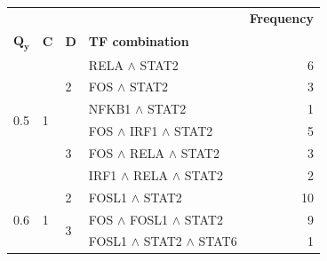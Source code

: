 \begin{tabular}{llllr}
\toprule
 &  &  &  & \textbf{Frequency} \\
$\mathbf{Q_y}$ & $\mathbf{C}$ & $\mathbf{D}$ & \textbf{TF combination} &  \\
\midrule
\multirow[t]{6}{*}{0.5} & \multirow[t]{6}{*}{1} & \multirow[t]{3}{*}{2} & {RELA $\wedge$ STAT2} & 6 \\
 &  &  & {FOS $\wedge$ STAT2} & 3 \\
 &  &  & {NFKB1 $\wedge$ STAT2} & 1 \\
\cline{3-5}
 &  & \multirow[t]{3}{*}{3} & {FOS $\wedge$ IRF1 $\wedge$ STAT2} & 5 \\
 &  &  & {FOS $\wedge$ RELA $\wedge$ STAT2} & 3 \\
 &  &  & {IRF1 $\wedge$ RELA $\wedge$ STAT2} & 2 \\
\cline{1-5} \cline{2-5} \cline{3-5}
\multirow[t]{3}{*}{0.6} & \multirow[t]{3}{*}{1} & 2 & {FOSL1 $\wedge$ STAT2} & 10 \\
\cline{3-5}
 &  & \multirow[t]{2}{*}{3} & {FOS $\wedge$ FOSL1 $\wedge$ STAT2} & 9 \\
 &  &  & {FOSL1 $\wedge$ STAT2 $\wedge$ STAT6} & 1 \\
\cline{1-5} \cline{2-5} \cline{3-5}
\bottomrule
\end{tabular}
